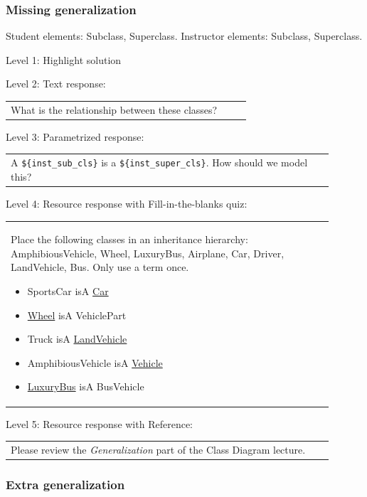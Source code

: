 \subsubsection{Missing generalization}

Student elements: Subclass, Superclass. Instructor elements: Subclass, Superclass. \medskip

\noindent Level 1: Highlight solution  \medskip

\noindent Level 2: Text response: \medskip

\begin{tabular}{|p{0.9\linewidth}}
What is the relationship between these classes?
\end{tabular} \medskip

\noindent Level 3: Parametrized response: \medskip

\begin{tabular}{|p{0.9\linewidth}}
A \verb|${inst_sub_cls}| is a \verb|${inst_super_cls}|. How should we model this?
\end{tabular} \medskip

\noindent Level 4: Resource response with Fill-in-the-blanks quiz: \medskip

\begin{tabular}{|p{0.9\linewidth}}

Place the following classes in an inheritance hierarchy: AmphibiousVehicle, Wheel, LuxuryBus, Airplane, Car, Driver, LandVehicle, Bus. Only use a term once.

\begin{itemize}
    \item SportsCar isA \underline{Car}
    \item \underline{Wheel} isA VehiclePart
    \item Truck isA \underline{LandVehicle}
    \item AmphibiousVehicle isA \underline{Vehicle}
    \item \underline{LuxuryBus} isA BusVehicle
\end{itemize}

\end{tabular} \medskip

\noindent Level 5: Resource response with Reference: \medskip

\begin{tabular}{|p{0.9\linewidth}}
Please review the \textit{Generalization} part of the Class Diagram lecture.
\end{tabular} \medskip


\subsubsection{Extra generalization}


